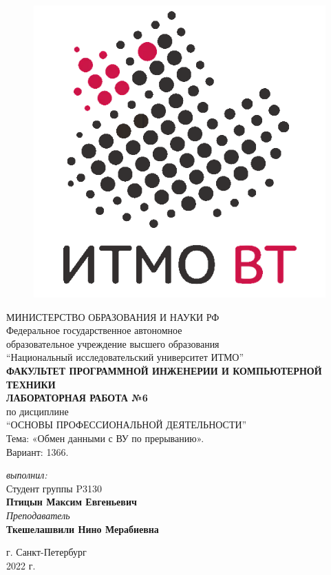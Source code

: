 \begin{center}

	\begin{figure}[H]
	\centering
	\includegraphics[scale=0.37]{img/sticker_dark}
	\end{figure}
	\hfill \break
	МИНИСТЕРСТВО ОБРАЗОВАНИЯ И НАУКИ РФ\\
	\hfill \break
	Федеральное государственное автономное\\
	образовательное учреждение высшего образования\\
	``Национальный исследовательский университет ИТМО''\\
	\hfill \break
	\textbf{ФАКУЛЬТЕТ ПРОГРАММНОЙ ИНЖЕНЕРИИ И КОМПЬЮТЕРНОЙ ТЕХНИКИ}\\
	\vspace{2cm}
	\large{\textbf{ЛАБОРАТОРНАЯ РАБОТА №6}}\\
	\hfill \break
	по дисциплине\\
	\large{``ОСНОВЫ ПРОФЕССИОНАЛЬНОЙ ДЕЯТЕЛЬНОСТИ''}\\
	Тема: «Обмен данными с ВУ по прерыванию».\\
	\hfill \break
	Вариант: 1366.
	\vspace{3cm}
	\begin{flushright}
	\textit{выполнил:}\\
	Студент группы P3130\\
	\textbf{Птицын Максим Евгеньевич}\\
	\textit{Преподаватель}\\
	\textbf{Ткешелашвили Нино Мерабиевна}
	\end{flushright}
\end{center}

\vfill

\begin{center} г. Санкт-Петербург\\2022 г.
\end{center}

\thispagestyle{empty}
\newpage